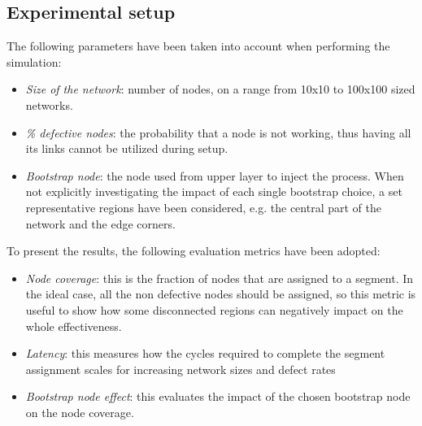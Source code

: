 \subsection{Experimental setup}
The following parameters have been taken into account when
performing the \disr{} simulation:
\begin{itemize}
\item {\emph{Size of the network}}: number of nodes, on a range from
10x10 to 100x100 sized networks. 
\item {\emph{\% defective nodes}}: the probability that a node is not
working, thus having all its links cannot be utilized during \disr{} setup.  
\item {\emph{Bootstrap node}}: the node used from upper layer 
to inject the \disr{} process. When not explicitly investigating the
impact of each single bootstrap choice, a set representative regions have been
considered, e.g. the central part of the network and the edge corners.
\end{itemize}
To present the results, the following evaluation metrics have been adopted:
\begin{itemize}
\item{\emph{Node coverage}}: this is the fraction of nodes that
are assigned to a segment. In the ideal case, all the non defective
nodes should be assigned, so this metric is useful to show how some
disconnected regions can negatively impact on the whole \disr{}
effectiveness.
\item{\emph{Latency}}: this measures how the cycles required to complete the
segment assignment scales for increasing network sizes and defect rates
\item{\emph{Bootstrap node effect}}: this evaluates the impact of the chosen
bootstrap node on the node coverage.
\end{itemize}


